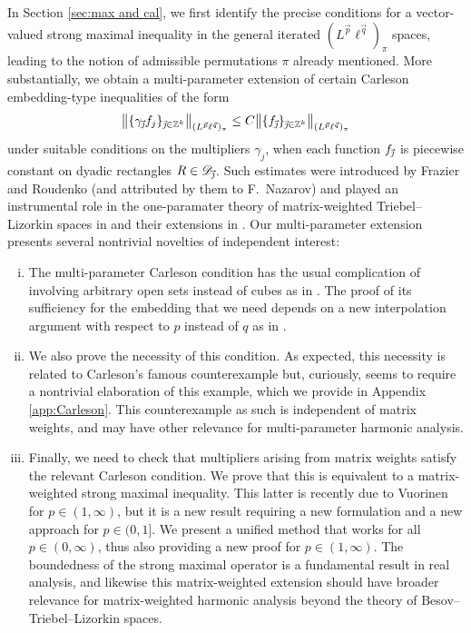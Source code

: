 \documentclass[11pt, reqno]{amsart}
\theoremstyle{definition}
\theoremstyle{remark}
\numberwithin{equation}{section}
\newcommand{\Z}{\mathbb Z}
\newcommand{\vj}{\vec{\textit{\j}}}
\newcommand{\vp}{\vec p}
\newcommand{\vq}{\vec q}
\newcommand{\bNorm}[2]{\big\|#1\big\|_{#2}}
\begin{document}
In Section \ref{sec:max and cal}, we first identify the precise conditions for a vector-valued strong maximal inequality in the general iterated $(L^{\vp}\ell^{\vq})_\pi$ spaces, leading to the notion of admissible permutations $\pi$ already mentioned. More substantially, we obtain a multi-parameter extension of certain Carleson embedding-type inequalities of the form
\begin{equation}\label{ce}
\bNorm{\{\gamma_{\vj}f_{j}\}_{\vj\in\Z^k}}{(L^{\vp}\ell^{\vq})_\pi}
\leq C \bNorm{\{ f_{\vj}\}_{\vj\in\Z^k}}{(L^{\vp}\ell^{\vq})_\pi}
\end{equation}
under suitable conditions on the multipliers $\gamma_j$,
when each function $f_{\vj}$ is piecewise constant on dyadic rectangles $R\in\mathscr D_{\vj}$.
Such estimates were introduced by Frazier and Roudenko \cite{FR21} (and attributed by them to F.~Nazarov) and played an instrumental role in the one-paramater theory of matrix-weighted Triebel--Lizorkin spaces in \cite{FR21} and their extensions in \cite{BHYY:1a,BHYY:2b}. Our multi-parameter extension presents several nontrivial novelties of independent interest:
\begin{enumerate}[(i)]
  \item The multi-parameter Carleson condition has the usual complication of involving arbitrary open sets instead of cubes as in \cite{FR21}. The proof of its sufficiency for the embedding that we need depends on a new interpolation argument with respect to $p$ instead of $q$ as in \cite{FR21}.
  \item We also prove the necessity of this condition. As expected, this necessity is related to Carleson's famous counterexample \cite{Car} but, curiously, seems to require a nontrivial elaboration of this example, which we provide in Appendix \ref{app:Carleson}. This counterexample as such is independent of matrix weights, and may have other relevance for multi-parameter harmonic analysis.
  \item Finally, we need to check that multipliers arising from matrix weights satisfy the relevant Carleson condition. We prove that this is equivalent to a matrix-weighted strong maximal inequality. This latter is recently due to Vuorinen \cite{Vuo24} for $p\in(1,\infty)$, but it is a new result requiring a  new formulation and a new approach for $p\in(0,1]$. We present a unified method that works for all $p\in(0,\infty)$, thus also providing a new proof for $p\in(1,\infty)$. The boundedness of the strong maximal operator is a fundamental result in real analysis, and likewise this matrix-weighted extension should have broader relevance for matrix-weighted harmonic analysis beyond the theory of Besov--Triebel--Lizorkin spaces.
\end{enumerate}
\end{document}
